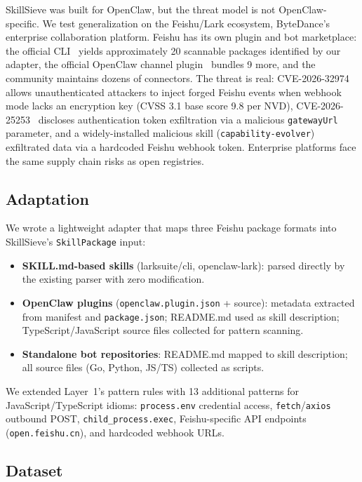 \documentclass[sigconf,nonacm]{acmart}
\begin{document}
SkillSieve was built for OpenClaw, but the threat model is not OpenClaw-specific. We test generalization on the Feishu/Lark ecosystem, ByteDance's enterprise collaboration platform. Feishu has its own plugin and bot marketplace: the official CLI~\cite{larkcli2026} yields approximately 20 scannable packages identified by our adapter, the official OpenClaw channel plugin~\cite{openclawlark2026} bundles 9 more, and the community maintains dozens of connectors. The threat is real: CVE-2026-32974~\cite{cve202632974} allows unauthenticated attackers to inject forged Feishu events when webhook mode lacks an encryption key (CVSS 3.1 base score 9.8 per NVD), CVE-2026-25253~\cite{cve202625253} discloses authentication token exfiltration via a malicious \texttt{gatewayUrl} parameter, and a widely-installed malicious skill (\texttt{capability-evolver}) exfiltrated data via a hardcoded Feishu webhook token. Enterprise platforms face the same supply chain risks as open registries.

\subsection{Adaptation}

We wrote a lightweight adapter that maps three Feishu package formats into SkillSieve's \texttt{SkillPackage} input:
\begin{itemize}
    \item \textbf{SKILL.md-based skills} (larksuite/cli, openclaw-lark): parsed directly by the existing parser with zero modification.
    \item \textbf{OpenClaw plugins} (\texttt{openclaw.plugin.json} + source): metadata extracted from manifest and \texttt{package.json}; README.md used as skill description; TypeScript/JavaScript source files collected for pattern scanning.
    \item \textbf{Standalone bot repositories}: README.md mapped to skill description; all source files (Go, Python, JS/TS) collected as scripts.
\end{itemize}
We extended Layer~1's pattern rules with 13 additional patterns for JavaScript/TypeScript idioms: \texttt{process.env} credential access, \texttt{fetch}/\texttt{axios} outbound POST, \texttt{child\_process.exec}, Feishu-specific API endpoints (\texttt{open.feishu.cn}), and hardcoded webhook URLs.

\subsection{Dataset}
\end{document}
